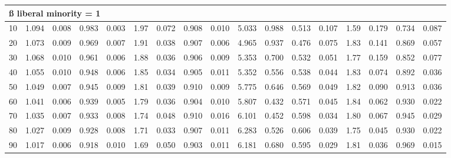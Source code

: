 \documentclass[
]{article}
\begin{document}
\begin{table}[H]
\begin{table}
{\begin{tabular}{r|r|r|r|r|r|r|r|r|r|r|r|r|r|r|r|r}
\hline
\multicolumn{17}{l}{\textbf{ß liberal minority = 1}}\\
\hline
\hspace{1em}10 & 1.094 & 0.008 & 0.983 & 0.003 & 1.97 & 0.072 & 0.908 & 0.010 & 5.033 & 0.988 & 0.513 & 0.107 & 1.59 & 0.179 & 0.734 & 0.087\\
\hline
\hspace{1em}20 & 1.073 & 0.009 & 0.969 & 0.007 & 1.91 & 0.038 & 0.907 & 0.006 & 4.965 & 0.937 & 0.476 & 0.075 & 1.83 & 0.141 & 0.869 & 0.057\\
\hline
\hspace{1em}30 & 1.068 & 0.010 & 0.961 & 0.006 & 1.88 & 0.036 & 0.906 & 0.009 & 5.353 & 0.700 & 0.532 & 0.051 & 1.77 & 0.159 & 0.852 & 0.077\\
\hline
\hspace{1em}40 & 1.055 & 0.010 & 0.948 & 0.006 & 1.85 & 0.034 & 0.905 & 0.011 & 5.352 & 0.556 & 0.538 & 0.044 & 1.83 & 0.074 & 0.892 & 0.036\\
\hline
\hspace{1em}50 & 1.049 & 0.007 & 0.945 & 0.009 & 1.81 & 0.039 & 0.910 & 0.009 & 5.775 & 0.646 & 0.569 & 0.049 & 1.82 & 0.090 & 0.913 & 0.036\\
\hline
\hspace{1em}60 & 1.041 & 0.006 & 0.939 & 0.005 & 1.79 & 0.036 & 0.904 & 0.010 & 5.807 & 0.432 & 0.571 & 0.045 & 1.84 & 0.062 & 0.930 & 0.022\\
\hline
\hspace{1em}70 & 1.035 & 0.007 & 0.933 & 0.008 & 1.74 & 0.048 & 0.910 & 0.016 & 6.101 & 0.452 & 0.598 & 0.034 & 1.80 & 0.067 & 0.945 & 0.029\\
\hline
\hspace{1em}80 & 1.027 & 0.009 & 0.928 & 0.008 & 1.71 & 0.033 & 0.907 & 0.011 & 6.283 & 0.526 & 0.606 & 0.039 & 1.75 & 0.045 & 0.930 & 0.022\\
\hline
\hspace{1em}90 & 1.017 & 0.006 & 0.918 & 0.010 & 1.69 & 0.050 & 0.903 & 0.011 & 6.181 & 0.680 & 0.595 & 0.029 & 1.81 & 0.036 & 0.969 & 0.015\\
\hline
\end{tabular}}
\end{table}
\end{table}

\renewcommand\refname{References}
  
\end{document}
